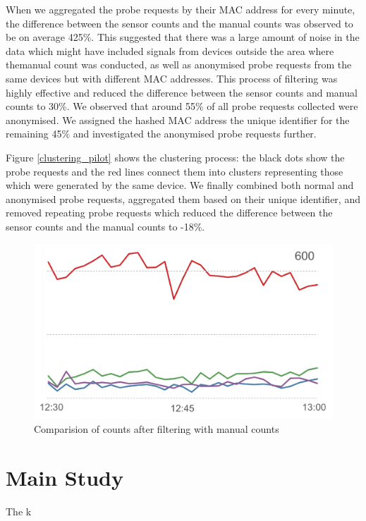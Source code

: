 \documentclass[11t, a4paper, twocolumn]{article}
\begin{document}
		When we aggregated the probe requests by their MAC address for every minute, the difference between the sensor counts and the manual counts was observed to be on average 425\%.
		This suggested that there was a large amount of noise in the data which might have included signals from devices outside the area where themanual count was conducted, as well as anonymised probe requests from the same devices but with different MAC addresses.
		This process of filtering was highly effective and reduced the difference between the sensor counts and manual counts to 30\%.
		We observed that around 55\% of all probe requests collected were anonymised.
		We assigned the hashed MAC address the unique identifier for the remaining 45\% and investigated the anonymised probe requests further.
	
		Figure \ref{clustering_pilot} shows the clustering process: the black dots show the probe requests and the red lines connect them into clusters representing those which were generated by the same device.
		We finally combined both normal and anonymised probe requests, aggregated them based on their unique identifier, and removed repeating probe requests which reduced the difference between the sensor counts and the manual counts to -18\%.

		\lipsum[2]
	
		\begin{figure}
			\begin{center}
				\includegraphics [width=\linewidth] {images/pilot_counts_comparision.png}
				\caption{Comparision of counts after filtering with manual counts}
				\label{comparision_pilot}
			\end{center}
		\end{figure}

	\section{Main Study}
		The k
\end{document}
